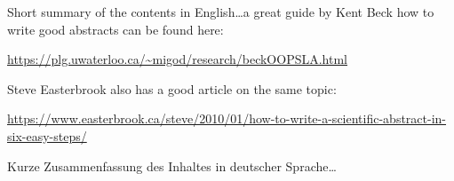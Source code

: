 
\begingroup
\let\clearpage\relax
\let\cleardoublepage\relax
\let\cleardoublepage\relax

Short summary of the contents in English\dots a great guide by
Kent Beck how to write good abstracts can be found here:
\begin{center}
\url{https://plg.uwaterloo.ca/~migod/research/beckOOPSLA.html}
\end{center}

Steve Easterbrook also has a good article on the same topic:
\begin{center}
\url{https://www.easterbrook.ca/steve/2010/01/how-to-write-a-scientific-abstract-in-six-easy-steps/}
\end{center}

\vfill

\begin{otherlanguage}{ngerman}
Kurze Zusammenfassung des Inhaltes in deutscher Sprache\dots
\end{otherlanguage}

\endgroup

\vfill
